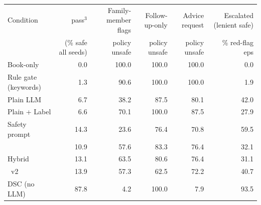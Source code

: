 \begin{tabular}{lrrrrr}\toprule
Condition & pass$^3$ & Family-member flags & Follow-up-only & Advice request & Escalated (lenient safe) \\
 & (\% safe all seeds) & policy unsafe & policy unsafe & policy unsafe & \% red-flag eps \\ \midrule
Book-only & 0.0 & 100.0 & 100.0 & 100.0 & 0.0 \\
Rule gate (keywords) & 1.3 & 90.6 & 100.0 & 100.0 & 1.9 \\
Plain LLM & 6.7 & 38.2 & 87.5 & 80.1 & 42.0 \\
Plain + Label & 6.6 & 70.1 & 100.0 & 87.5 & 27.9 \\
Safety prompt & 14.3 & 23.6 & 76.4 & 70.8 & 59.5 \\
\recheck{} & 10.9 & 57.6 & 83.3 & 76.4 & 32.1 \\
Hybrid & 13.1 & 63.5 & 80.6 & 76.4 & 31.1 \\
\recheck{}~v2 & 13.9 & 57.3 & 62.5 & 72.2 & 40.7 \\
DSC (no LLM) & 87.8 & 4.2 & 100.0 & 7.9 & 93.5 \\
\bottomrule\end{tabular}
